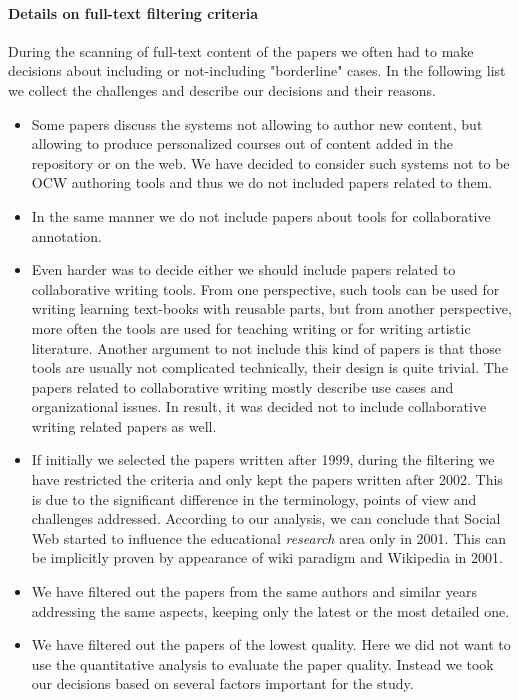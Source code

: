 \documentclass[ngerman,UKenglish,table]{scrbook}
\begin{document}
\paragraph{Details on full-text filtering criteria}
During the scanning of full-text content of the papers we often had to make decisions about including or not-including "borderline" cases.
In the following list we collect the challenges and describe our decisions and their reasons.
\begin{itemize}
\item Some papers discuss the systems not allowing to author new content, but allowing to produce personalized courses out of content added in the repository or on the web.
We have decided to consider such systems not to be OCW authoring tools and thus we do not included papers related to them.
\item In the same manner we do not include papers about tools for collaborative annotation.
\item Even harder was to decide either we should include papers related to collaborative writing tools.
From one perspective, such tools can be used for writing learning text-books with reusable parts, but from another perspective, more often the tools are used for teaching writing or for writing artistic literature.
Another argument to not include this kind of papers is that those tools are usually not complicated technically, their design is quite trivial. 
The papers related to collaborative writing mostly describe use cases and organizational issues. 
In result, it was decided not to include collaborative writing related papers as well.
\item If initially we selected the papers written after 1999, during the filtering we have restricted the criteria and only kept the papers written after 2002.
This is due to the significant difference in the terminology, points of view and challenges addressed.
According to our analysis, we can conclude that Social Web started to influence the educational \emph{research} area only in 2001. 
This can be implicitly proven by appearance of wiki paradigm and Wikipedia in 2001.
\item We have filtered out the papers from the same authors and similar years addressing the same aspects, keeping only the latest or the most detailed one. 
\item We have filtered out the papers of the lowest quality.
Here we did not want to use the quantitative analysis to evaluate the paper quality.
Instead we took our decisions based on several factors important for the study.

\end{itemize}
\end{document}
